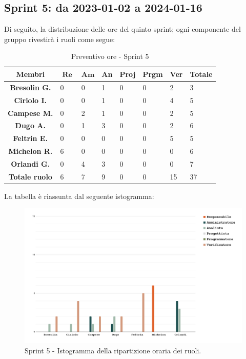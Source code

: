 \documentclass[10pt, a4paper]{article}
\begin{document}
\subsection{Sprint 5: da 2023-01-02 a 2024-01-16}
Di seguito, la distribuzione delle ore del quinto sprint; ogni componente del gruppo rivestirà i ruoli come segue:
\begin{table}[H]
    \begin{tabularx}{\textwidth}{c|X|X|X|X|X|X|X}
        \textbf{Membri} & $\operatorname{\textbf{Re}}$ & $\mathrm{\textbf{Am}}$ & \textbf{An} & \textbf{Proj} & \textbf{Prgm} & \textbf{Ver} & \textbf{Totale} \\
        \hline
        \textbf{Bresolin G.} & 0 & 0 & 1 & 0 & 0 & \cellcolor{primarycolor}2 & 3 \\
        \hline
        \textbf{Ciriolo I.}  & 0 & 0 & 1 & 0 & 0 & \cellcolor{primarycolor}4 & 5 \\
        \hline
        \textbf{Campese M.}  & 0 & \cellcolor{primarycolor}2 & 1 & 0 & 0 & 2 & 5 \\
        \hline
        \textbf{Dugo A.}     & 0 & 1 & \cellcolor{primarycolor}3 & 0 & 0 & 2 & 6 \\
        \hline
        \textbf{Feltrin E.}  & 0 & 0 & 0 & 0 & 0 &\cellcolor{primarycolor} 5 & 5 \\
        \hline
        \textbf{Michelon R.} & \cellcolor{primarycolor}6 & 0 & 0 & 0 & 0 & 0 & 6 \\
        \hline
        \textbf{Orlandi G.}  & 0 & 4 & \cellcolor{primarycolor}3 & 0 & 0 & 0 & 7 \\
        \hline
        \textbf{Totale ruolo} & 6 & 7 & 9 & 0 & 0 & 15 & 37 \\
    \end{tabularx}
    \caption{Preventivo ore - Sprint 5}
\end{table}

La tabella è riassunta dal seguente istogramma:
 \begin{figure}[H]
        \centering        
        \includegraphics[width=15.5cm]{istogrammi/istogramma_5_periodo.png}
        \caption{Sprint 5 - Istogramma della ripartizione oraria dei ruoli. }
    \end{figure}
\end{document}
